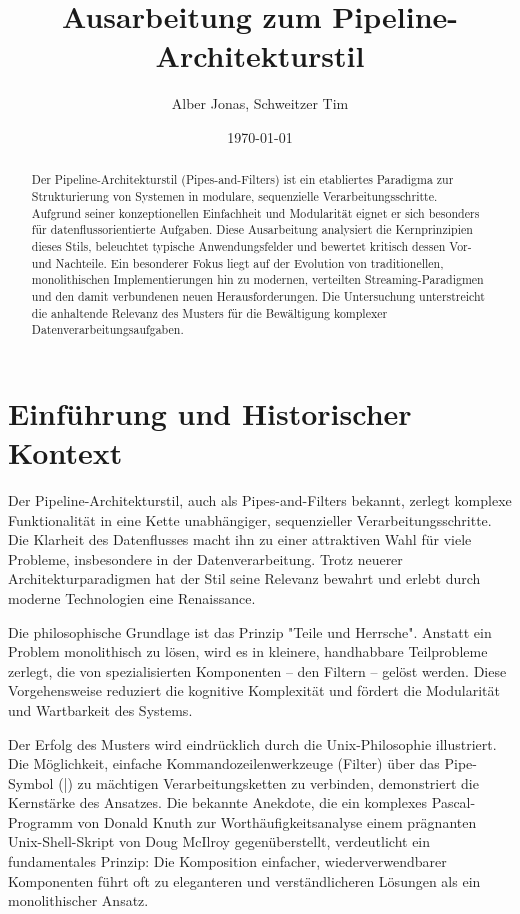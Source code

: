 \documentclass[10pt,a4paper]{article}
\title{Ausarbeitung zum Pipeline-Architekturstil}
\author{Alber Jonas, Schweitzer Tim}
\date{\today}
\begin{document}
\maketitle

\begin{abstract}
\noindent %
Der Pipeline-Architekturstil (Pipes-and-Filters) ist ein etabliertes Paradigma zur Strukturierung von Systemen in modulare, sequenzielle Verarbeitungsschritte. Aufgrund seiner konzeptionellen Einfachheit und Modularität eignet er sich besonders für datenflussorientierte Aufgaben.\cite{richards2020} Diese Ausarbeitung analysiert die Kernprinzipien dieses Stils, beleuchtet typische Anwendungsfelder und bewertet kritisch dessen Vor- und Nachteile. Ein besonderer Fokus liegt auf der Evolution von traditionellen, monolithischen Implementierungen hin zu modernen, verteilten Streaming-Paradigmen und den damit verbundenen neuen Herausforderungen. Die Untersuchung unterstreicht die anhaltende Relevanz des Musters für die Bewältigung komplexer Datenverarbeitungsaufgaben.
\end{abstract}

\section{Einführung und Historischer Kontext}
Der Pipeline-Architekturstil, auch als Pipes-and-Filters bekannt, zerlegt komplexe Funktionalität in eine Kette unabhängiger, sequenzieller Verarbeitungsschritte. Die Klarheit des Datenflusses macht ihn zu einer attraktiven Wahl für viele Probleme, insbesondere in der Datenverarbeitung. Trotz neuerer Architekturparadigmen hat der Stil seine Relevanz bewahrt und erlebt durch moderne Technologien eine Renaissance.

Die philosophische Grundlage ist das Prinzip "Teile und Herrsche". Anstatt ein Problem monolithisch zu lösen, wird es in kleinere, handhabbare Teilprobleme zerlegt, die von spezialisierten Komponenten – den Filtern – gelöst werden. Diese Vorgehensweise reduziert die kognitive Komplexität und fördert die Modularität und Wartbarkeit des Systems.\cite{richards2020}

Der Erfolg des Musters wird eindrücklich durch die Unix-Philosophie illustriert. Die Möglichkeit, einfache Kommandozeilenwerkzeuge (Filter) über das Pipe-Symbol (|) zu mächtigen Verarbeitungsketten zu verbinden, demonstriert die Kernstärke des Ansatzes.\cite{richards2020, uqcloud_pipeline} Die bekannte Anekdote, die ein komplexes Pascal-Programm von Donald Knuth zur Worthäufigkeitsanalyse einem prägnanten Unix-Shell-Skript von Doug McIlroy gegenüberstellt, verdeutlicht ein fundamentales Prinzip: Die Komposition einfacher, wiederverwendbarer Komponenten führt oft zu eleganteren und verständlicheren Lösungen als ein monolithischer Ansatz.\cite{richards2020}
\end{document}
